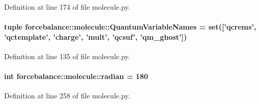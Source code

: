 \-Definition at line 174 of file molecule.\-py.

\hypertarget{namespaceforcebalance_1_1molecule_a483603baba28d76694b2d5f1e7b37813}{
\paragraph[{\-Quantum\-Variable\-Names}]{\setlength{\rightskip}{0pt plus 5cm}tuple {\bf forcebalance\-::molecule\-::\-Quantum\-Variable\-Names} = set(\mbox{[}'qcrems', 'qctemplate', 'charge', 'mult', 'qcsuf', 'qm\-\_\-ghost'\mbox{]})}}\label{namespaceforcebalance_1_1molecule_a483603baba28d76694b2d5f1e7b37813}


\-Definition at line 135 of file molecule.\-py.

\hypertarget{namespaceforcebalance_1_1molecule_a922ed32eb838098c0b77423c624a4487}{
\paragraph[{radian}]{\setlength{\rightskip}{0pt plus 5cm}int {\bf forcebalance\-::molecule\-::radian} = 180}}\label{namespaceforcebalance_1_1molecule_a922ed32eb838098c0b77423c624a4487}


\-Definition at line 258 of file molecule.\-py.

